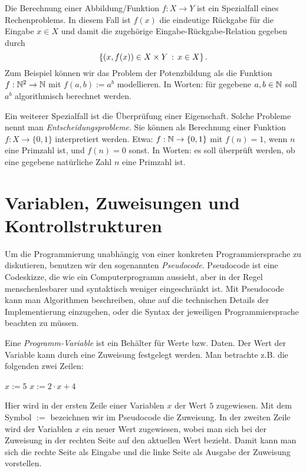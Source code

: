 \begin{bem}
Die Berechnung einer Abbildung/Funktion $f : X \to Y$ ist ein Spezialfall eines Rechenproblems. In diesem Fall ist $f(x)$ die eindeutige Rückgabe für die Eingabe $x \in X$ und damit die zugehörige Eingabe-Rückgabe-Relation gegeben durch
\[
\left\{ (x,f(x)) \in X \times Y \,:\, x \in X \right\}.
\]
Zum Beispiel können wir das Problem der Potenzbildung als die Funktion $f : \mathbb{N}^2 \to \mathbb{N}$ mit $f(a,b) := a^b$ modellieren. In Worten: für gegebene $a, b \in \mathbb{N}$ soll $a^b$ algorithmisch berechnet werden. 
\end{bem} 

\begin{defn}
Ein weiterer Spezialfall ist die Überprüfung einer Eigenschaft. Solche Probleme nennt man \emph{Entscheidungsprobleme}. Sie können als Berechnung einer Funktion $f : X \to \{0,1\}$ interpretiert werden. Etwa: $f : \mathbb{N} \to \{0,1\}$ mit $f(n) = 1$, wenn $n$ eine Primzahl ist, und $f(n) =0$ sonst. In Worten: es soll überprüft werden, ob eine gegebene natürliche Zahl $n$ eine Primzahl ist. 
\end{defn} 

\section{Variablen, Zuweisungen und Kontrollstrukturen}

\begin{bem} 
Um die Programmierung unabhängig von einer konkreten Programmiersprache zu diskutieren, benutzen wir den sogenannten \emph{Pseudocode}. Pseudocode ist eine Codeskizze, die wie ein Computerprogramm aussieht, aber in der Regel menschenlesbarer und syntaktisch weniger eingeschränkt ist. Mit Pseudocode kann man Algorithmen beschreiben, ohne auf die technischen Details der Implementierung einzugehen, oder die Syntax der jeweiligen Programmiersprache beachten zu müssen.
\end{bem} 

\begin{bem} 
Eine \emph{Programm-Variable} ist ein Behälter für Werte bzw. Daten. Der Wert der Variable kann durch eine Zuweisung festgelegt werden. Man betrachte z.B. die folgenden zwei Zeilen:

\begin{center}
	\begin{algorithmic}[1]
		\STATE $x:=5$
		\STATE $x:=2 \cdot x + 4$
	\end{algorithmic}
\end{center}
Hier wird in der ersten Zeile einer Variablen $x$ der Wert $5$ zugewiesen. Mit dem Symbol $:=$ bezeichnen wir im Pseudocode die Zuweisung. In der zweiten Zeile wird der Variablen $x$ ein neuer Wert zugewiesen, wobei man sich bei der Zuweisung in der rechten Seite auf den aktuellen Wert bezieht. Damit kann man sich die rechte Seite als Eingabe und die linke Seite als Ausgabe der Zuweisung vorstellen.
\end{bem} 

